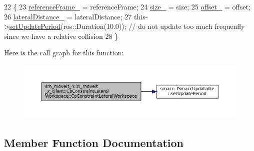 \begin{DoxyCode}
22         \{
23             \hyperlink{classsm__moveit__4_1_1cl__moveit__z__client_1_1CpConstraintLateralWorkspace_a69be978ebfd12ba0ada5d4ccf4333a06}{referenceFrame\_} = referenceFrame;
24             \hyperlink{classsm__moveit__4_1_1cl__moveit__z__client_1_1CpConstraintLateralWorkspace_a35fb6ec0933eff1c2e4a7930b9815fcb}{size\_} = size;
25             \hyperlink{classsm__moveit__4_1_1cl__moveit__z__client_1_1CpConstraintLateralWorkspace_a511cfdaa29f05d8b81a3c53b7241c51e}{offset\_} = offset;
26             \hyperlink{classsm__moveit__4_1_1cl__moveit__z__client_1_1CpConstraintLateralWorkspace_afe12f95ff8a79564f4f7d944b2c3cf1d}{lateralDistance\_} = lateralDistance;
27             this->\hyperlink{classsmacc_1_1ISmaccUpdatable_a88f3b092a81b2d8810a9776c8c69855b}{setUpdatePeriod}(ros::Duration(10.0)); \textcolor{comment}{// do not update too much frequenfly
       since we have a relative collision}
28         \}
\end{DoxyCode}
Here is the call graph for this function\+:
\nopagebreak
\begin{figure}[H]
\begin{center}
\leavevmode
\includegraphics[width=350pt]{classsm__moveit__4_1_1cl__moveit__z__client_1_1CpConstraintLateralWorkspace_a698854121e40c7c12ef8fce6f684cfea_cgraph}
\end{center}
\end{figure}


\subsection{Member Function Documentation}
\mbox{\label{classsm__moveit__4_1_1cl__moveit__z__client_1_1CpConstraintLateralWorkspace_ac27089379dc98fbecf699b18e0797aba}} 
